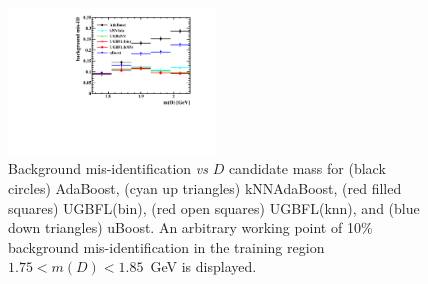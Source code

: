 \begin{figure}[] 
  \centering 
  \includegraphics[width=0.49\textwidth]{MD_eff.pdf}
  \caption{\label{fig:dalitz_results} Background mis-identification {\em vs} $D$ candidate mass for (black circles) AdaBoost, (cyan up triangles) kNNAdaBoost, (red filled squares) UGBFL(bin), (red open squares) UGBFL(knn), and (blue down triangles) uBoost.  An arbitrary working point of 10\% background mis-identification in the training region $1.75 < m(D) < 1.85$~GeV is displayed.}
\end{figure}
